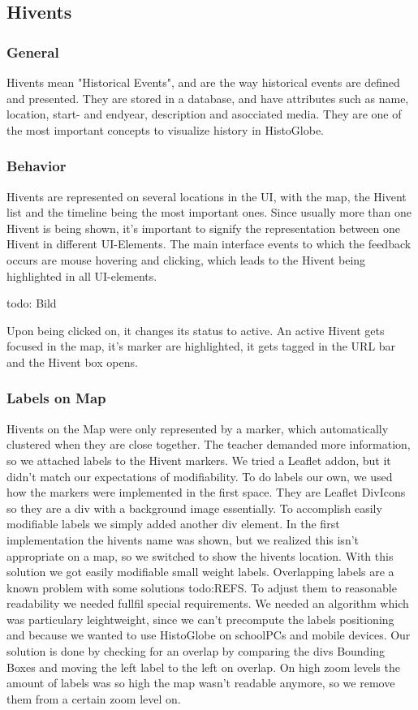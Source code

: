 \subsection{Hivents} %
\label{sec:hivents}

\subsubsection{General} %
\label{sub:general}
Hivents mean "Historical Events", and are the way historical events are defined and presented. They are stored in a database, and have attributes such as name, location, start- and endyear, description and asocciated media.
They are one of the most important concepts to visualize history in HistoGlobe.

\subsubsection{Behavior} %
\label{sub:behaviour}
Hivents are represented on several locations in the UI, with the map, the Hivent list and the timeline being the most important ones.
Since usually more than one Hivent is being shown, it's important to signify the representation between one Hivent in different UI-Elements.
The main interface events to which the feedback occurs are mouse hovering and clicking, which leads to the Hivent being highlighted in all UI-elements.

todo: Bild

Upon being clicked on, it changes its status to active. An active Hivent gets focused in the map, it's marker are highlighted, it gets tagged in the URL bar and the Hivent box opens.

\subsubsection{Labels on Map}
Hivents on the Map were only represented by a marker, which automatically clustered when they are close together.
The teacher demanded more information, so we attached labels to the Hivent markers.
We tried a Leaflet addon, but it didn't match our expectations of modifiability.
To do labels our own, we used how the markers were implemented in the first space. They are Leaflet DivIcons so they are a div with a background image essentially. To accomplish easily modifiable labels we simply added another div element.
In the first implementation the hivents name was shown, but we realized this isn't appropriate on a map, so we switched to show the hivents location. With this solution we got easily modifiable small weight labels.
Overlapping labels are a known problem with some solutions todo:REFS.
To adjust them to reasonable readability we needed fullfil special requirements.
We needed an algorithm which was particulary leightweight, since we can't precompute the labels positioning and because we wanted to use HistoGlobe on schoolPCs and mobile devices.
Our solution is done by checking for an overlap by comparing the divs Bounding Boxes and moving the left label to the left on overlap.
On high zoom levels the amount of labels was so high the map wasn't readable anymore, so we remove them from a certain zoom level on.


